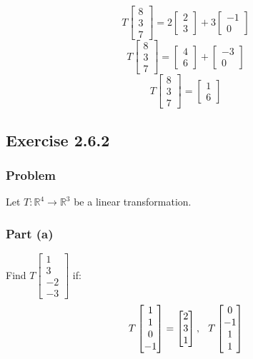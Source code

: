 \documentclass[12pt]{article}
\begin{document}
\[
  T\begin{bmatrix}
    8\\ 
    3\\ 
    7 
  \end{bmatrix} = 2\begin{bmatrix}
  2\\ 
  3 
  \end{bmatrix} + 3\begin{bmatrix}
  -1\\ 
  0 
  \end{bmatrix}
\]
\[
  T\begin{bmatrix}
    8\\ 
    3\\ 
    7 
    \end{bmatrix} = \begin{bmatrix}
    4\\ 
    6 
    \end{bmatrix} + \begin{bmatrix}
    -3\\ 
    0 
  \end{bmatrix}
\]
\[
  T\begin{bmatrix}
    8\\ 
    3\\ 
    7 
  \end{bmatrix} = \begin{bmatrix}
  1\\ 
  6 
\end{bmatrix}
\]
\vspace{2in}
\subsection*{Exercise 2.6.2}
\subsubsection*{Problem}
Let $T: \mathbb{R}^4 \rightarrow \mathbb{R}^3$ be a linear transformation.
\subsubsection*{Part (a)}
Find $T\begin{bmatrix}
  1\\ 
  3\\ 
  -2\\ 
  -3 
\end{bmatrix}
$ if:
\[
  T\begin{bmatrix}
    1\\ 
    1\\ 
    0\\ 
    -1 
  \end{bmatrix} = \begin{bmatrix}
  2\\ 
  3\\ 
  1 
  \end{bmatrix}, \hspace{0.1in} T\begin{bmatrix}
  0\\ 
  -1\\ 
  1\\ 
  1 
\end{bmatrix}
\]
\end{document}
